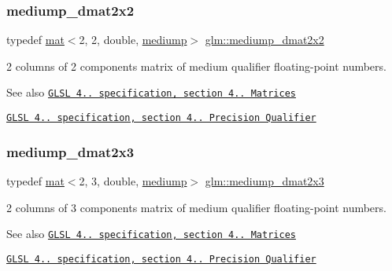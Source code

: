 \subsubsection{\texorpdfstring{mediump\+\_\+dmat2x2}{mediump\_dmat2x2}}
{\footnotesize\ttfamily typedef \hyperlink{structglm_1_1mat}{mat}$<$2, 2, double, \hyperlink{namespaceglm_a36ed105b07c7746804d7fdc7cc90ff25a6416f3ea0c9025fb21ed50c4d6620482}{mediump}$>$ \hyperlink{group__core__precision_ga3d91f269872b4664d2f500b6dee986eb}{glm\+::mediump\+\_\+dmat2x2}}

2 columns of 2 components matrix of medium qualifier floating-\/point numbers.

\begin{DoxySeeAlso}{See also}
\href{http://www.opengl.org/registry/doc/GLSLangSpec.4.20.8.pdf}{\tt G\+L\+SL 4.. specification, section 4.. Matrices} 

\href{http://www.opengl.org/registry/doc/GLSLangSpec.4.20.8.pdf}{\tt G\+L\+SL 4.. specification, section 4.. Precision Qualifier} 
\end{DoxySeeAlso}
\mbox{\label{group__core__precision_gaf3a6e61247ffcbbf9211186d0d250a2b}} 
\subsubsection{\texorpdfstring{mediump\+\_\+dmat2x3}{mediump\_dmat2x3}}
{\footnotesize\ttfamily typedef \hyperlink{structglm_1_1mat}{mat}$<$2, 3, double, \hyperlink{namespaceglm_a36ed105b07c7746804d7fdc7cc90ff25a6416f3ea0c9025fb21ed50c4d6620482}{mediump}$>$ \hyperlink{group__core__precision_gaf3a6e61247ffcbbf9211186d0d250a2b}{glm\+::mediump\+\_\+dmat2x3}}

2 columns of 3 components matrix of medium qualifier floating-\/point numbers.

\begin{DoxySeeAlso}{See also}
\href{http://www.opengl.org/registry/doc/GLSLangSpec.4.20.8.pdf}{\tt G\+L\+SL 4.. specification, section 4.. Matrices} 

\href{http://www.opengl.org/registry/doc/GLSLangSpec.4.20.8.pdf}{\tt G\+L\+SL 4.. specification, section 4.. Precision Qualifier} 
\end{DoxySeeAlso}
\mbox{\label{group__core__precision_ga20d1a647a3ef0083e306d026c77ac906}} 
